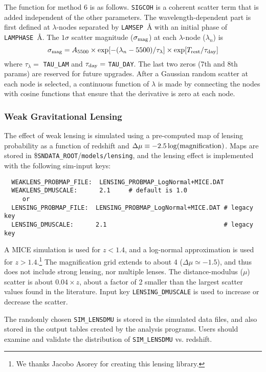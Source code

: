 \documentclass[12pt]{article}
\newcommand{\Trest}{T_{\rm rest}}
\newcommand{\sndataroot}{{\tt SNDATA\_ROOT}}
\begin{document}
{The function for method 6 is as follows.
{\tt SIGCOH} is a coherent scatter term that is added independent
of the other parameters. The wavelength-dependent part is first
defined at $\lambda$-nodes separated by {\tt LAMSEP}~{\AA} with an initial
phase of {\tt LAMPHASE}~{\AA}. The $1\sigma$ scatter magnitude
($\sigma_{\rm mag}$) at each $\lambda$-node ($\lambda_n$) is
\begin{equation}
  \sigma_{\rm mag} = A_{5500} \times \exp[ -(\lambda_n - 5500)/\tau_{\lambda} ] 
    \times \exp[ \Trest/\tau_{\rm day}]
\end{equation}
%
where 
$\tau_{\lambda}=$ {\tt TAU\_LAM} and
$\tau_{\rm day}=$ {\tt TAU\_DAY}.
The last two zeros (7th and 8th params) are reserved for future upgrades.
After a Gaussian random scatter at each node is selected, a continuous
function of $\lambda$ is made by connecting the nodes with cosine functions
that ensure that the derivative is zero at each node.


\subsubsection{Weak Gravitational Lensing}
\label{sss:weak_lensing}

The effect of weak lensing is simulated using a pre-computed
map of lensing probability as a function of redshift and
$\Delta\mu \equiv -2.5\log({\rm magnification})$.
Maps are stored in \$\sndataroot/{\tt models/lensing},
and the lensing effect is implemented with the following
sim-input keys:
%
\begin{verbatim}
  WEAKLENS_PROBMAP_FILE:  LENSING_PROBMAP_LogNormal+MICE.DAT
  WEAKLENS_DMUSCALE:      2.1     # default is 1.0
     or
  LENSING_PROBMAP_FILE:  LENSING_PROBMAP_LogNormal+MICE.DAT # legacy key
  LENSING_DMUSCALE:      2.1                                # legacy key
\end{verbatim}
%
A MICE simulation \cite{MICE2015} is used for $z<1.4$, 
and a log-normal approximation \cite{LogNormal2013}
is used for $z>1.4$.\footnote{We thanks Jacobo Asorey for
creating this lensing library.}
The magnification grid extends to about 4 ($\Delta\mu \simeq -1.5$),
and thus does not include strong lensing, nor multiple lenses.
The distance-modulus ($\mu$) scatter is about $0.04\times z$,
about a factor of 2 smaller than the largest scatter values
found in the literature. Input key {\tt LENSING\_DMUSCALE}
is used to increase or decrease the scatter.

The randomly chosen {\tt SIM\_LENSDMU} is stored in the
simulated data files, and also stored in the output tables
created by the analysis programs.
Users should examine and validate the distribution of
{\tt SIM\_LENSDMU} vs. redshift.

}
\end{document}
